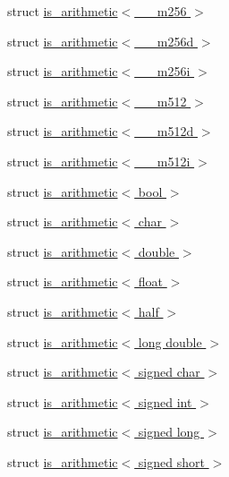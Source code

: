 \begin{DoxyCompactItemize}
\item 
struct \hyperlink{struct_eigen_1_1internal_1_1is__arithmetic_3_01____m256_01_4}{is\+\_\+arithmetic$<$ \+\_\+\+\_\+m256 $>$}
\item 
struct \hyperlink{struct_eigen_1_1internal_1_1is__arithmetic_3_01____m256d_01_4}{is\+\_\+arithmetic$<$ \+\_\+\+\_\+m256d $>$}
\item 
struct \hyperlink{struct_eigen_1_1internal_1_1is__arithmetic_3_01____m256i_01_4}{is\+\_\+arithmetic$<$ \+\_\+\+\_\+m256i $>$}
\item 
struct \hyperlink{struct_eigen_1_1internal_1_1is__arithmetic_3_01____m512_01_4}{is\+\_\+arithmetic$<$ \+\_\+\+\_\+m512 $>$}
\item 
struct \hyperlink{struct_eigen_1_1internal_1_1is__arithmetic_3_01____m512d_01_4}{is\+\_\+arithmetic$<$ \+\_\+\+\_\+m512d $>$}
\item 
struct \hyperlink{struct_eigen_1_1internal_1_1is__arithmetic_3_01____m512i_01_4}{is\+\_\+arithmetic$<$ \+\_\+\+\_\+m512i $>$}
\item 
struct \hyperlink{struct_eigen_1_1internal_1_1is__arithmetic_3_01bool_01_4}{is\+\_\+arithmetic$<$ bool $>$}
\item 
struct \hyperlink{struct_eigen_1_1internal_1_1is__arithmetic_3_01char_01_4}{is\+\_\+arithmetic$<$ char $>$}
\item 
struct \hyperlink{struct_eigen_1_1internal_1_1is__arithmetic_3_01double_01_4}{is\+\_\+arithmetic$<$ double $>$}
\item 
struct \hyperlink{struct_eigen_1_1internal_1_1is__arithmetic_3_01float_01_4}{is\+\_\+arithmetic$<$ float $>$}
\item 
struct \hyperlink{struct_eigen_1_1internal_1_1is__arithmetic_3_01half_01_4}{is\+\_\+arithmetic$<$ half $>$}
\item 
struct \hyperlink{struct_eigen_1_1internal_1_1is__arithmetic_3_01long_01double_01_4}{is\+\_\+arithmetic$<$ long double $>$}
\item 
struct \hyperlink{struct_eigen_1_1internal_1_1is__arithmetic_3_01signed_01char_01_4}{is\+\_\+arithmetic$<$ signed char $>$}
\item 
struct \hyperlink{struct_eigen_1_1internal_1_1is__arithmetic_3_01signed_01int_01_4}{is\+\_\+arithmetic$<$ signed int $>$}
\item 
struct \hyperlink{struct_eigen_1_1internal_1_1is__arithmetic_3_01signed_01long_01_4}{is\+\_\+arithmetic$<$ signed long $>$}
\item 
struct \hyperlink{struct_eigen_1_1internal_1_1is__arithmetic_3_01signed_01short_01_4}{is\+\_\+arithmetic$<$ signed short $>$}

\end{DoxyCompactItemize}
